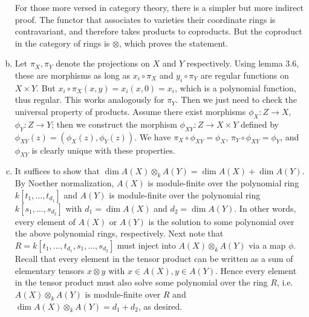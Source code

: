 \documentclass{../mathnotes}
\begin{document}
\begin{enumerate}[(a)]
For those more versed in category theory, there is a simpler but more indirect proof. The functor that associates to varieties their coordinate rings is contravariant, and therefore takes products to coproducts. But the coproduct in the category of rings is $\otimes$, which proves the statement.
    \item Let $\pi_X, \pi_Y$ denote the projections on $X$ and $Y$ respectively. Using lemma 3.6, these are morphisms as long as $x_i \circ \pi_X$ and $y_i \circ \pi_Y$ are regular functions on $X \times Y$. But $x_i \circ \pi_X (x, y) = x_i (x, 0) = x_i$, which is a polynomial function, thus regular. This works analogously for $\pi_Y$. Then we just need to check the universal property of products. Assume there exist morphisms $\phi_X :Z \to X$, $\phi_Y : Z \to Y$; then we construct the morphism $\phi_{XY} : Z \to X \times Y$ defined by $\phi_{XY} (z) = (\phi_X (z) , \phi_Y(z))$. We have $\pi_X \circ \phi_{XY} = \phi_X$, $\pi_Y \circ \phi_{XY} = \phi_Y$, and $\phi_{XY}$ is clearly unique with these properties.
    \item It suffices to show that $\dim A(X)\otimes_k A(Y)=\dim A(X)+\dim A(Y)$. By Noether
        normalization, $A(X)$ is module-finite over the polynomial ring $k[t_1,\ldots,t_{d_1}]$
        and $A(Y)$ is module-finite over the polynomial ring $k[s_1,\ldots,s_{d_2}]$ with
        $d_1=\dim A(X)$ and $d_2=\dim A(Y)$. In other words, every element of $A(X)$ or $A(Y)$
        is the solution to some polynomial over the above polynomial rings, respectively.
        Next note that $R=k[t_1,\ldots,t_{d_1}, s_1,\ldots,s_{d_2}]$ must inject into
        $A(X)\otimes_kA(Y)$ via a map $\phi$. 
        Recall that every element in the tensor product can be written as a sum of elementary tensors
        $x\otimes y$ with $x\in A(X),y\in A(Y)$. Hence every element in the tensor product must
        also solve some polynomial over the ring $R$, i.e. $A(X)\otimes_kA(Y)$ is module-finite
        over $R$ and $\dim A(X)\otimes_kA(Y)=d_1+d_2$, as desired.
\end{enumerate}
\end{document}
